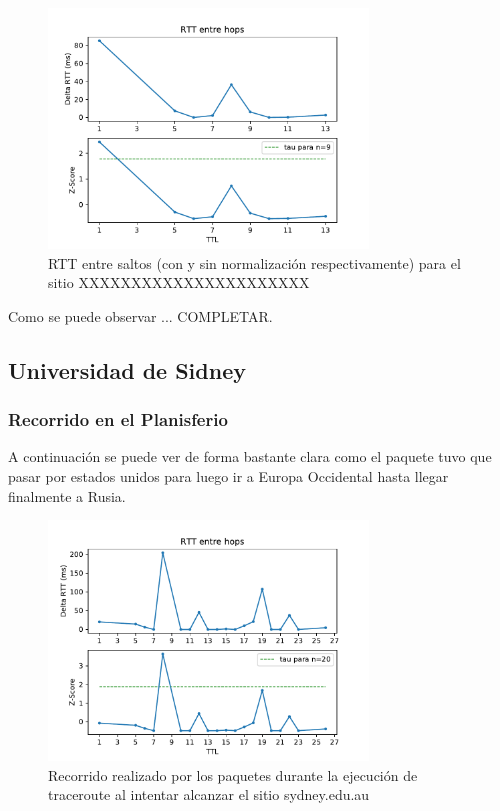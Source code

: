\begin{figure}[H]
  \centering
  \includegraphics[width=8.5cm]{figs/traceroute-saopaulo.pdf}
  \caption{\normalfont RTT entre saltos (con y sin normalización respectivamente) para el sitio XXXXXXXXXXXXXXXXXXXXXX}
\end{figure}

Como se puede observar ... COMPLETAR.


\subsection*{Universidad de Sidney}

\subsubsection*{Recorrido en el Planisferio}

A continuación se puede ver de forma bastante clara como el paquete tuvo que pasar por estados unidos para luego ir a Europa Occidental hasta llegar finalmente a Rusia.

\begin{figure}[H]
  \centering
  \includegraphics[width=8.5cm]{figs/traceroute-sidney.pdf}
  \caption{\normalfont Recorrido realizado por los paquetes durante la ejecución de traceroute al intentar alcanzar el sitio sydney.edu.au}
\end{figure}


